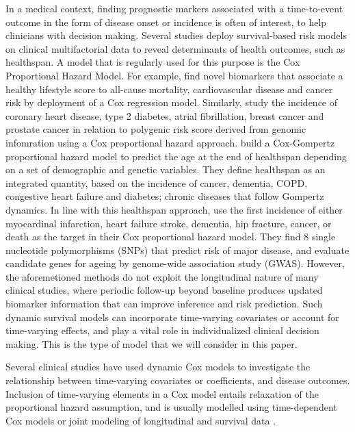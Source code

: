 In a medical context, finding prognostic markers associated with a time-to-event outcome in the form of disease onset or incidence is often of interest, to help clinicians with decision making. 
Several studies deploy survival-based risk models on clinical multifactorial data to reveal determinants of health outcomes, such as healthspan. A model that is regularly used for this purpose is the Cox Proportional Hazard Model. For example, \cite{bonaccio2019impact} find novel biomarkers that associate a healthy lifestyle score to all-cause mortality, cardiovascular disease and cancer risk by deployment of a Cox regression model. Similarly, \cite{mars2020polygenic} study the incidence of coronary heart disease, type 2 diabetes, atrial fibrillation, breast cancer and prostate cancer in relation to polygenic risk score derived from genomic infomration using a Cox proportional hazard approach. \cite{zenin2019identification} build a Cox-Gompertz proportional hazard model to predict the age at the end of healthspan depending on a set of demographic and genetic variables. They define healthspan as an integrated quantity, based on the incidence of cancer, dementia, COPD, congestive heart failure and diabetes; chronic diseases that follow Gompertz dynamics. In line with this healthspan approach, \cite{walter2011genome} use the first incidence of either myocardinal infarction, heart failure stroke, dementia, hip fracture, cancer, or death as the target in their Cox proportional hazard model. They find 8 single nucleotide polymorphisms (SNPs) that predict risk of major disease, and evaluate candidate genes for ageing by genome-wide association study (GWAS).  %
However, the aforemetioned methods do not exploit the longitudinal nature of many clinical studies, where periodic follow-up beyond baseline produces updated biomarker information that can improve inference and risk prediction. 
Such dynamic survival models can incorporate time-varying covariates or account for time-varying effects, and play a vital role in individualized clinical decision making. This is the type of model that we will consider in this paper. 
 
Several clinical studies have used dynamic Cox models to investigate the relationship between time-varying covariates or coefficients, and disease outcomes. Inclusion of time-varying elements in a Cox model entails relaxation of the proportional hazard assumption, and is usually modelled using time-dependent Cox models or joint modeling of longitudinal and survival data \citep{zhang2018time}. 

